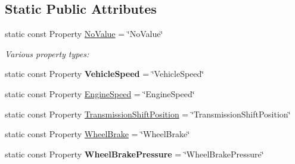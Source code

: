 \subsection*{Static Public Attributes}
\begin{DoxyCompactItemize}
\item 
static const Property \hyperlink{classVehicleProperty_ae013e9c1f3fb57d646211d3e6bb4ca9e}{No\-Value} = \char`\"{}No\-Value\char`\"{}
\begin{DoxyCompactList}\small\item\em Various property types\-: \end{DoxyCompactList}\item 
\hypertarget{classVehicleProperty_af457ed63f945a7f6b4e074f3ba8b904f}{static const Property {\bfseries Vehicle\-Speed} = \char`\"{}Vehicle\-Speed\char`\"{}}\label{classVehicleProperty_af457ed63f945a7f6b4e074f3ba8b904f}

\item 
static const Property \hyperlink{classVehicleProperty_a7949fe3d031814fc2644de14f8cec9a0}{Engine\-Speed} = \char`\"{}Engine\-Speed\char`\"{}
\item 
static const Property \hyperlink{classVehicleProperty_ae486d9ea26918460822086b797018800}{Transmission\-Shift\-Position} = \char`\"{}Transmission\-Shift\-Position\char`\"{}
\item 
static const Property \hyperlink{classVehicleProperty_ad4f1ec038bee5ef30fbf8308aaba2794}{Wheel\-Brake} = \char`\"{}Wheel\-Brake\char`\"{}
\item 
\hypertarget{classVehicleProperty_a617cc19f62d99f7f72a047d5066dcd96}{static const Property {\bfseries Wheel\-Brake\-Pressure} = \char`\"{}Wheel\-Brake\-Pressure\char`\"{}}\label{classVehicleProperty_a617cc19f62d99f7f72a047d5066dcd96}


\end{DoxyCompactItemize}

